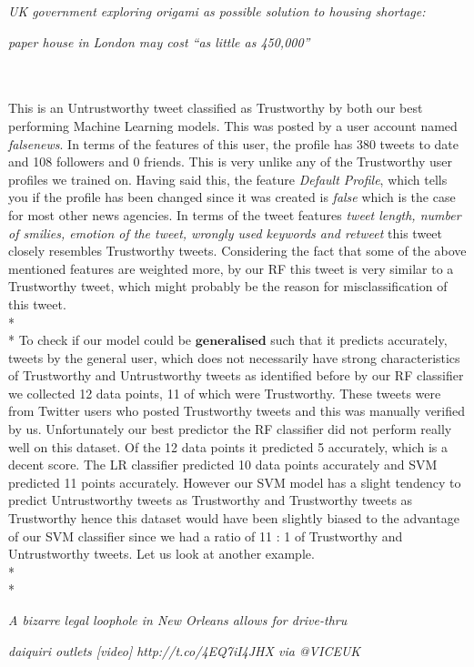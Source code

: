 \centerline{\textit{UK government exploring origami as possible solution to housing shortage: }} 
\centerline{\textit{paper house in London may cost ``as little as 450,000''}}\leavevmode \\\\
This is an Untrustworthy tweet classified as Trustworthy by both our best performing Machine Learning models. This was posted by a user account named \textit{falsenews}. In terms of the features of this user, the profile has 380 tweets to date and 108 followers and 0 friends. This is very unlike any of the Trustworthy user profiles we trained on. Having said this, the feature \textit{Default Profile}, which tells you if the profile has been changed since it was created is \textit{false} which is the case for most other news agencies. In terms of the tweet features \textit{ tweet length, number of smilies, emotion of the tweet, wrongly used keywords and retweet} this tweet closely resembles Trustworthy tweets. Considering the fact that some of the above mentioned features are weighted more, by our RF this tweet is very similar to a Trustworthy tweet, which might probably be the reason for misclassification of this tweet. \\*\\*
To check if our model could be $\textbf{generalised}$ such that it predicts accurately, tweets by the general user, which does not necessarily have strong characteristics of Trustworthy and Untrustworthy tweets as identified before by our RF classifier we collected 12 data points, 11 of which were Trustworthy. These tweets were from Twitter users who posted Trustworthy tweets and this was manually verified by us. Unfortunately our best predictor the RF classifier did not perform really well on this dataset. Of the 12 data points it predicted 5 accurately, which is a decent score. The LR classifier predicted 10 data points accurately and SVM predicted 11 points accurately. However our SVM model has a slight tendency to predict Untrustworthy tweets as Trustworthy and  Trustworthy tweets as Trustworthy hence this dataset would have been slightly biased to the advantage of our SVM classifier since we had a ratio of 11 : 1 of Trustworthy and Untrustworthy tweets. Let us look at another example. \\*\\*
\centerline{\textit{A bizarre legal loophole in New Orleans allows for drive-thru }}
\centerline{\textit{daiquiri outlets [video] http://t.co/4EQ7iI4JHX via @VICEUK}}\leavevmode \\\\
